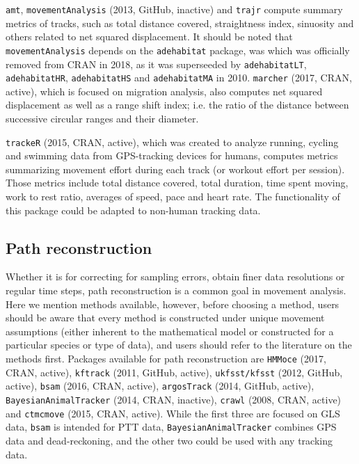 \documentclass[a4paper,12pt]{article}
\newcommand{\Rpkg}[1]{\texttt{#1}}
\begin{document}
\Rpkg{amt}, \Rpkg{movementAnalysis} (2013, GitHub, inactive) and \Rpkg{trajr} compute summary metrics of tracks, such as total distance covered, straightness index, sinuosity and others related to net squared displacement. It should be noted that \Rpkg{movementAnalysis} depends on the \Rpkg{adehabitat} package, was which was officially removed from CRAN in 2018, as it was superseeded by \Rpkg{adehabitatLT}, \Rpkg{adehabitatHR}, \Rpkg{adehabitatHS} and \Rpkg{adehabitatMA} in 2010. \Rpkg{marcher} (2017, CRAN, active), which is focused on migration analysis, also computes net squared displacement as well as a range shift index; i.e. the ratio of the distance between successive circular ranges and their diameter. 

\Rpkg{trackeR} (2015, CRAN, active), which was created to analyze running, cycling and swimming data from GPS-tracking devices for humans, computes metrics summarizing movement effort during each track (or workout effort per session). Those metrics include total distance covered, total duration, time spent moving, work to rest ratio, averages of speed, pace and heart rate. The functionality of this package could be adapted to non-human tracking data.


\subsection*{Path reconstruction}

Whether it is for correcting for sampling errors, obtain finer data resolutions or regular time steps, path reconstruction is a common goal in movement analysis. Here we mention methods available, however, before choosing a method, users should be aware that every method is constructed under unique movement assumptions (either inherent to the mathematical model or constructed for a particular species or type of data), and users should refer to the literature on the methods first. Packages available for path reconstruction are \Rpkg{HMMoce} (2017, CRAN, active), \Rpkg{kftrack} (2011, GitHub, active), \Rpkg{ukfsst/kfsst} (2012, GitHub, active), \Rpkg{bsam} (2016, CRAN, active), \Rpkg{argosTrack} (2014, GitHub, active), \Rpkg{BayesianAnimalTracker} (2014, CRAN, inactive), \Rpkg{crawl} (2008, CRAN, active) and \Rpkg{ctmcmove} (2015, CRAN, active). While the first three are focused on GLS data, \Rpkg{bsam} is intended for PTT data, \Rpkg{BayesianAnimalTracker} combines GPS data and dead-reckoning, and the other two could be used with any tracking data.
\end{document}

